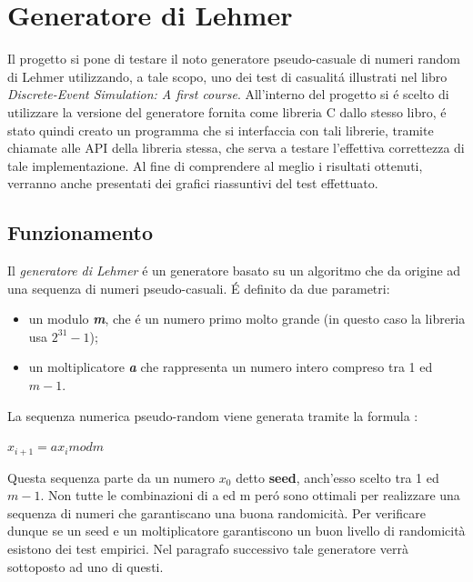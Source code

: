 \chapter{Generatore di Lehmer}
	\label{cap:generatorerandom}

Il progetto si pone di testare il noto generatore pseudo-casuale di numeri 
random di Lehmer utilizzando, a tale scopo, uno dei test di casualit\'a 
illustrati nel libro \textit{Discrete-Event Simulation: A first course}.
All'interno del progetto si \'e scelto di utilizzare la versione del generatore
fornita come libreria C dallo stesso libro, \'e stato quindi creato un programma che si interfaccia con tali librerie, tramite chiamate alle API della libreria 
stessa,
che serva a testare l'effettiva correttezza di tale implementazione.
Al fine di comprendere al meglio i risultati ottenuti, verranno anche
presentati dei grafici riassuntivi del test effettuato.

\section{Funzionamento}
Il \textit{generatore di Lehmer} \'e un generatore basato su un algoritmo che da 
origine ad una sequenza di numeri pseudo-casuali. \'E definito da due parametri:

\begin{itemize}
 \item un modulo \textbf{\textit{m}}, che \'e un numero primo molto grande (in 
questo caso la libreria usa $2^{31} - 1$);
 \item un moltiplicatore \textbf{\textit{a}} che rappresenta un numero intero 
compreso tra 1 ed $m-1$.
\end{itemize}

\noindent La sequenza numerica pseudo-random viene generata tramite la formula :

\begin{center} $x_{i+1} = ax_{i} mod m$ \end{center}

\noindent Questa sequenza parte da un numero $x_{0}$ detto \textbf{seed}, anch'esso 
scelto tra 1 ed $m-1$. Non tutte le combinazioni di a ed m per\'o sono ottimali 
per realizzare una sequenza di numeri che garantiscano una buona randomicit\`a. 
Per verificare dunque se un seed e un moltiplicatore garantiscono un buon 
livello di 
randomicit\`a esistono dei test empirici. Nel paragrafo successivo tale generatore 
verr\`a sottoposto ad uno di questi.

